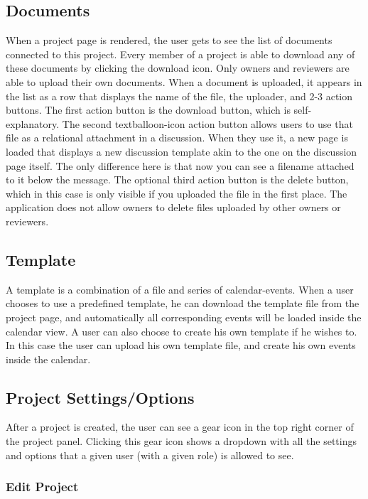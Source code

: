 \subsection{Documents}

When a project page is rendered, the user gets to see the list of documents connected to this project. Every member of a project is able to download
any of these documents by clicking the download icon. Only owners and reviewers are able to upload their own documents. When a document is uploaded,
it appears in the list as a row that displays the name of the file, the uploader, and 2-3 action buttons. The first action button is the download 
button, which is self-explanatory. The second textballoon-icon action button allows users to use that file as a relational attachment in a discussion.
When they use it, a new page is loaded that displays a new discussion template akin to the one on the discussion page itself. The only difference here
is that now you can see a filename attached to it below the message. The optional third action button is the delete button, which in this case is
only visible if you uploaded the file in the first place. The application does not allow owners to delete files uploaded by other owners or reviewers.

\subsection{Template}

A template is a combination of a file and series of calendar-events. When a user chooses to use a predefined template, he can download the template file
from the project page, and automatically all corresponding events will be loaded inside the calendar view. A user can also choose to create his own 
template if he wishes to. In this case the user can upload his own template file, and create his own events inside the calendar.

\subsection{Project Settings/Options}

After a project is created, the user can see a gear icon in the top right corner of the project panel. Clicking this gear icon shows a dropdown
with all the settings and options that a given user (with a given role) is allowed to see.

\subsubsection{Edit Project}


